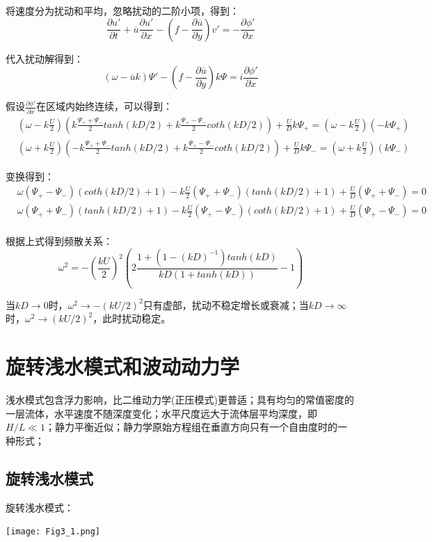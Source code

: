 \documentclass{article}
\begin{document}
将速度分为扰动和平均，忽略扰动的二阶小项，得到：
$$\frac{\partial u'}{\partial t} + \overline{u}\frac{\partial u'}{\partial x} 
 - (f-\frac{\partial \overline{u}}{\partial y})v' = -\frac{\partial\phi'}{\partial x}$$

代入扰动解得到：
$$(\omega  - \overline{u}k)\Psi' 
- (f - \frac{\partial\overline{u}}{\partial y})k\Psi = i\frac{\partial \phi'}{\partial x}$$

假设$\frac{\partial \phi'}{\partial x}$在区域内始终连续，可以得到：
\begin{align}
    & (\omega - k\frac{U}{2})(k\frac{\Psi_+ + \Psi_-}{2}tanh(kD/2) 
    + k\frac{\Psi_+ - \Psi_-}{2}coth(kD/2)) 
    + \frac{U}{D}k\Psi_+
    = (\omega - k\frac{U}{2})(-k\Psi_+) \\
    & (\omega + k\frac{U}{2})(-k\frac{\Psi_+ + \Psi_-}{2}tanh(kD/2) 
    + k\frac{\Psi_+ - \Psi_-}{2}coth(kD/2)) + \frac{U}{D}k\Psi_-
    = (\omega + k\frac{U}{2})(k\Psi_-) 
\end{align}

变换得到：
\begin{align}
    & \omega (\Psi_+ - \Psi_-)(coth(kD/2)+1)
    - k\frac{U}{2}(\Psi_+ + \Psi_-)(tanh(kD/2)+1)
    + \frac{U}{D}(\Psi_+ + \Psi_-)
    = 0 \\
    & \omega(\Psi_+ + \Psi_-)(tanh(kD/2)+1)
    - k\frac{U}{2}(\Psi_+ - \Psi_-)(coth(kD/2)+1)
    + \frac{U}{D}(\Psi_+ - \Psi_-)
    = 0 \\
\end{align}

根据上式得到频散关系：
$$\omega^2 = -(\frac{kU}{2})^2(2\frac{1+(1-(kD)^{-1})tanh(kD)}{kD(1+tanh(kD))}-1)$$

当$kD\rightarrow0$时，$\omega^2\rightarrow -(kU/2)^2$只有虚部，扰动不稳定增长或衰减；当$kD \rightarrow \infty$时，$\omega^2 \rightarrow (kU/2)^2$，此时扰动稳定。


\newpage

\section{旋转浅水模式和波动动力学}
浅水模式包含浮力影响，比二维动力学(正压模式)更普适；具有均匀的常值密度的一层流体，水平速度不随深度变化；水平尺度远大于流体层平均深度，即$H/L \ll 1$；静力平衡近似；静力学原始方程组在垂直方向只有一个自由度时的一种形式；

\subsection{旋转浅水模式}
旋转浅水模式：
\begin{center}
    \texttt{[image: Fig3\_1.png]}
\end{center}
\end{document}
